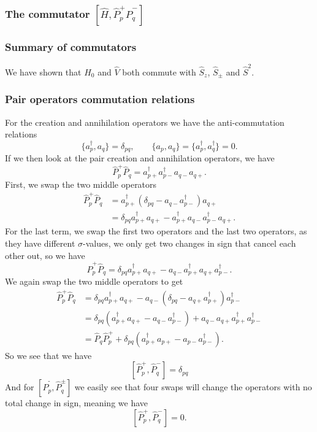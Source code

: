 \documentclass[a4paper, 11pt, notitlepage, english]{article}
\newcommand{\op}[1]{\hat{#1}}
\newcommand{\m}{\text{-}}
\begin{document}
\subsubsection*{The commutator $[\op{H}, \op{P}_p^+\op{P}_q^-]$}

\subsubsection*{Summary of commutators}
We have shown that $\op{H}_0$ and $\op{V}$ both commute with $\op{S}_z$, $\op{S}_\pm$ and $\op{S}^2$.

\subsubsection*{Pair operators commutation relations}
For the creation and annihilation operators we have the anti-commutation relations
$$\{a_{p}^\dagger, a_{q}\} = \delta_{pq}, \qquad \{a_{p}, a_{q}\} = \{a_{p}^\dagger, a_{q}^\dagger\} = 0.$$
If we then look at the pair creation and annihilation operators, we have
$$\op{P}_p^+ \op{P}_q = a_{p+}^\dagger a_{p-}^\dagger a_{q-} a_{q+}.$$
First, we swap the two middle operators
\begin{align*}
\op{P}_p^+ \op{P}_q &= a_{p+}^\dagger (\delta_{pq} - a_{q-}a_{p-}^\dagger) a_{q+} \\
&= \delta_{pq} a_{p+}^\dagger a_{q+} - a_{p+}^\dagger a_{q-}a_{p-}^\dagger a_{q+}.
\end{align*}
For the last term, we swap the first two operators and the last two operators, as they have different $\sigma$-values, we only get two changes in sign that cancel each other out, so we have
$$\op{P}_p^+ \op{P}_q = \delta_{pq} a_{p+}^\dagger a_{q+} -  a_{q-}a_{p+}^\dagger a_{q+}a_{p-}^\dagger.$$
We again swap the two middle operators to get
\begin{align*}
\op{P}_p^+ \op{P}_q &= \delta_{pq} a_{p+}^\dagger a_{q+} -  a_{q-} (\delta_{pq} - a_{q+}a_{p+}^\dagger) a_{p-}^\dagger \\
&= \delta_{pq} (a_{p+}^\dagger a_{q+} -  a_{q-}a_{p-}^\dagger) + a_{q-}a_{q+}a_{p+}^\dagger a_{p-}^\dagger \\
&= \op{P}_q \op{P}_p^+ + \delta_{pq} (a_{p+}^\dagger a_{p+} -  a_{p-}a_{p-}^\dagger).
\end{align*}
So we see that we have
$$[\op{P}_p^+, \op{P}_q^-] = \delta_{pq}$$
And for $[\op{P}_p^\m, \op{P}_q^\pm]$ we easily see that four swaps will change the operators with no total change in sign, meaning we have
$$[\op{P}_p^+, \op{P}_q^-] = 0.$$
\end{document}
